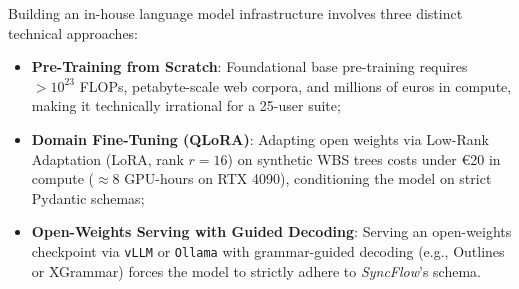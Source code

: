 Building an in-house language model infrastructure involves three distinct technical approaches:
\begin{itemize}[itemsep=1.5pt,topsep=1.5pt]
    \item \textbf{Pre-Training from Scratch}: Foundational base pre-training requires $>10^{23}$ FLOPs, petabyte-scale web corpora, and millions of euros in compute, making it technically irrational for a 25-user suite;
    
    \vspace{1mm}
    
    \item \textbf{Domain Fine-Tuning (QLoRA)}: Adapting open weights via Low-Rank Adaptation (LoRA, rank $r=16$) on synthetic WBS trees costs under €20 in compute ($\approx 8$ GPU-hours on RTX 4090), conditioning the model on strict Pydantic schemas;
    
    \vspace{1mm}
    
    \item \textbf{Open-Weights Serving with Guided Decoding}: Serving an open-weights checkpoint via \texttt{vLLM} or \texttt{Ollama} with grammar-guided decoding (e.g., Outlines or XGrammar) forces the model to strictly adhere to \textit{SyncFlow}'s schema.
\end{itemize}

\vspace{4mm}

